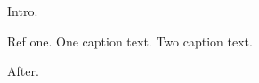 \documentclass{article}
\newenvironment{refs}{\par}{\par}
\begin{document}
Intro.
\begin{refs}
Ref one.
\figure One caption text.
\figure Two caption text.
\end{refs}
After.
\end{document}
